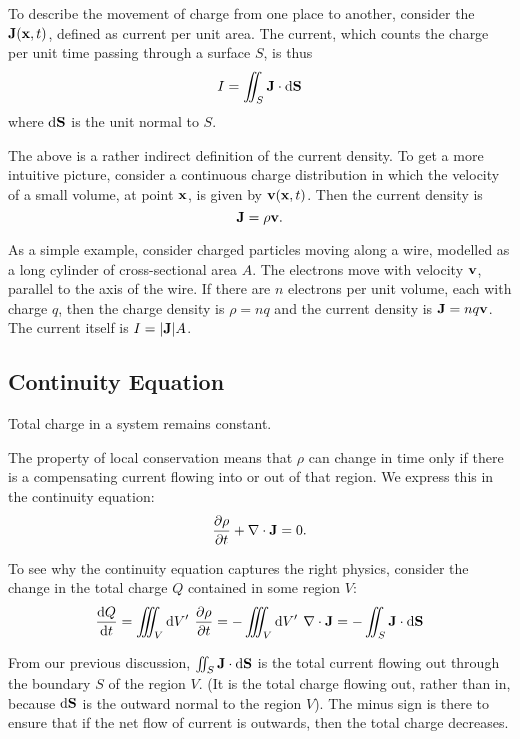 To describe the movement of charge from one place to another, consider the  $\vb{J}(\vb{x},t)$, defined as current per unit area. The current, which counts the charge per unit time passing through a surface $S$, is thus
\[I=\iint_S\vb{J}\cdot\dd{\vb{S}}\]
where $\dd{\vb{S}}$ is the unit normal to $S$.

The above is a rather indirect definition of the current density. To get a more intuitive picture, consider a continuous charge distribution in which the velocity of a small volume, at point $\vb{x}$, is given by $\vb{v}(\vb{x},t)$. Then the current density is
\[\vb{J}=\rho\vb{v}.\]

As a simple example, consider charged particles moving along a wire, modelled as a long cylinder of cross-sectional area $A$. The electrons move with velocity $\vb{v}$, parallel to the axis of the wire. If there are $n$ electrons per unit volume, each with charge $q$, then the charge density is $\rho=nq$ and the current density is $\vb{J}=nq\vb{v}$. The current itself is $I=|\vb{J}|A$.

\subsection{Continuity Equation}
\begin{law}
Total charge in a system remains constant.
\end{law}

The property of local conservation means that $\rho$ can change in time only if there is a compensating current flowing into or out of that region. We express this in the continuity equation:
\begin{equation}
\pdv{\rho}{t}+\nabla\cdot\vb{J}=0.
\end{equation}

To see why the continuity equation captures the right physics, consider the change in the total charge $Q$ contained in some region $V$:
\[\dv{Q}{t}=\iiint_V \dd{V^\prime}\:\pdv{\rho}{t}=-\iiint_V\dd{V^\prime}\:\nabla\cdot\vb{J}=-\iint_S\vb{J}\cdot\dd{\vb{S}}\]

From our previous discussion, $\iint_S\vb{J}\cdot\dd{\vb{S}}$ is the total current flowing out through the boundary $S$ of the region $V$. (It is the total charge flowing out, rather than in, because $\dd{\vb{S}}$ is the outward normal to the region $V$). The minus sign is there to ensure that if the net flow of current is outwards, then the total charge decreases.

